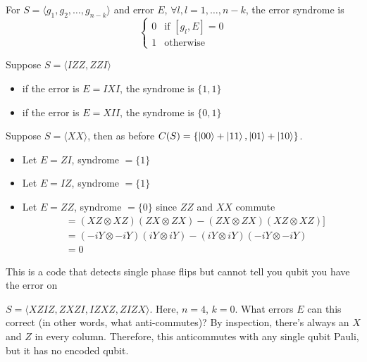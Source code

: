 \begin{definition}
    For $S = \langle g_1,g_2,\ldots,g_{n-k}\rangle$ and error $E$, $\forall l, l= 1, \ldots, n-k$, the error syndrome is 
    \begin{equation}
        \begin{cases}
            0 & \text{if } [g_l,E] = 0 \\
            1 & \text{otherwise}
        \end{cases}
    \end{equation}
\end{definition}
\begin{example} 
    Suppose $S = \langle IZZ, ZZI\rangle$
    \begin{itemize}
        \item if the error is $E = IXI$, the syndrome is $\{1,1\}$
        \item if the error is $E = XII$, the syndrome is $\{0,1\}$
    \end{itemize}
\end{example}
\begin{example}
    Suppose $S = \langle XX \rangle$, then as before $C(S) = \{\ket{00} + \ket{11}, \ket{01} + \ket{10}\}$. 
    \begin{itemize}
        \item Let $E=ZI$, syndrome $= \{1\}$
        \item Let $E=IZ$, syndrome $= \{1\}$
        \item Let $E=ZZ$, syndrome $= \{0\}$ since $ZZ$ and $XX$ commute 
        \begin{align}
            [XX,ZZ] &= (XZ\otimes XZ)(ZX \otimes ZX) - (ZX \otimes ZX)(XZ\otimes XZ)] \\
            &= (-iY\otimes -iY)(iY\otimes iY) - (iY\otimes iY)(-iY\otimes -iY) \\
            &=0 
        \end{align}
    \end{itemize}
    This is a code that detects single phase flips but cannot tell you qubit you have the error on
\end{example}

\begin{example}
    $S = \langle XZIZ, ZXZI, IZXZ,ZIZX \rangle$. Here, $n=4$, $k=0$. What errors $E$ can this correct (in other words, what anti-commutes)? By inspection, there's always an $X$ and $Z$ in every column. Therefore, this anticommutes with any single qubit Pauli, but it has no encoded qubit. 
\end{example}

